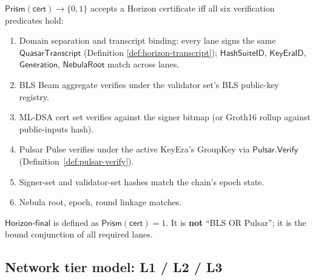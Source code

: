 \begin{definition}[Prism]
\label{def:prism}
$\mathsf{Prism}(\mathsf{cert}) \to \{0, 1\}$ accepts a Horizon
certificate iff all six verification predicates hold:
\begin{enumerate}[nosep]
  \item Domain separation and transcript binding: every lane signs the
        same $\mathsf{QuasarTranscript}$ (Definition
        \ref{def:horizon-transcript}); $\mathsf{HashSuiteID}$,
        $\mathsf{KeyEraID}$, $\mathsf{Generation}$, $\mathsf{NebulaRoot}$
        match across lanes.
  \item BLS Beam aggregate verifies under the validator set's BLS
        public-key registry.
  \item ML-DSA cert set verifies against the signer bitmap (or Groth16
        rollup against public-inputs hash).
  \item Pulsar Pulse verifies under the active KeyEra's GroupKey via
        $\mathsf{Pulsar.Verify}$ (Definition~\ref{def:pulsar-verify}).
  \item Signer-set and validator-set hashes match the chain's epoch state.
  \item Nebula root, epoch, round linkage matches.
\end{enumerate}
$\mathsf{Horizon\text{-}final}$ is defined as
$\mathsf{Prism}(\mathsf{cert}) = 1$. It is \textbf{not}
``BLS OR Pulsar''; it is the bound conjunction of all required lanes.
\end{definition}

\subsection*{Network tier model: L1 / L2 / L3}

